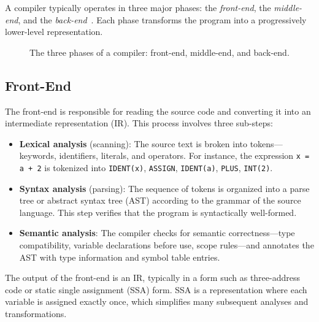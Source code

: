 A compiler typically operates in three major phases: the \textit{front-end}, the \textit{middle-end}, and the \textit{back-end}~\cite{aho2006compilers}. Each phase transforms the program into a progressively lower-level representation.

\begin{figure}[H]
    \centering
    \caption{The three phases of a compiler: front-end, middle-end, and back-end.}
    \label{fig:compiler-pipeline}
\end{figure}

\subsection{Front-End}

The front-end is responsible for reading the source code and converting it into an intermediate representation (IR). This process involves three sub-steps:

\begin{itemize}
    \item \textbf{Lexical analysis} (scanning): The source text is broken into tokens—keywords, identifiers, literals, and operators. For instance, the expression \texttt{x = a + 2} is tokenized into \texttt{IDENT(x)}, \texttt{ASSIGN}, \texttt{IDENT(a)}, \texttt{PLUS}, \texttt{INT(2)}.
    \item \textbf{Syntax analysis} (parsing): The sequence of tokens is organized into a parse tree or abstract syntax tree (AST) according to the grammar of the source language. This step verifies that the program is syntactically well-formed.
    \item \textbf{Semantic analysis}: The compiler checks for semantic correctness—type compatibility, variable declarations before use, scope rules—and annotates the AST with type information and symbol table entries.
\end{itemize}

The output of the front-end is an IR, typically in a form such as three-address code or static single assignment (SSA) form. SSA is a representation where each variable is assigned exactly once, which simplifies many subsequent analyses and transformations.

